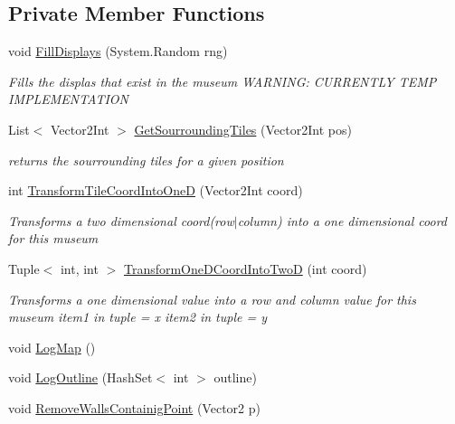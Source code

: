 \subsection*{Private Member Functions}
\begin{DoxyCompactItemize}
\item 
void \mbox{\hyperlink{class_museum_ae07741bc8fd7f97c84fed0050e18c3c4}{Fill\+Displays}} (System.\+Random rng)
\begin{DoxyCompactList}\small\item\em Fills the displas that exist in the museum W\+A\+R\+N\+I\+NG\+: C\+U\+R\+R\+E\+N\+T\+LY T\+E\+MP I\+M\+P\+L\+E\+M\+E\+N\+T\+A\+T\+I\+ON \end{DoxyCompactList}\item 
List$<$ Vector2\+Int $>$ \mbox{\hyperlink{class_museum_af5b732fe3a0821d02852171a73cf8f8b}{Get\+Sourrounding\+Tiles}} (Vector2\+Int pos)
\begin{DoxyCompactList}\small\item\em returns the sourrounding tiles for a given position \end{DoxyCompactList}\item 
int \mbox{\hyperlink{class_museum_a405e60db962417dde46d46180cbf81df}{Transform\+Tile\+Coord\+Into\+OneD}} (Vector2\+Int coord)
\begin{DoxyCompactList}\small\item\em Transforms a two dimensional coord(row$\vert$column) into a one dimensional coord for this museum \end{DoxyCompactList}\item 
Tuple$<$ int, int $>$ \mbox{\hyperlink{class_museum_a72e9020ee5d8406df0fc41fc4295727f}{Transform\+One\+D\+Coord\+Into\+TwoD}} (int coord)
\begin{DoxyCompactList}\small\item\em Transforms a one dimensional value into a row and column value for this museum item1 in tuple = x item2 in tuple = y \end{DoxyCompactList}\item 
void \mbox{\hyperlink{class_museum_a6a161feedcbb8a471eb0e68b7e3e4027}{Log\+Map}} ()
\item 
void \mbox{\hyperlink{class_museum_a237d1ccf7cb53c4db64647b6addc6576}{Log\+Outline}} (Hash\+Set$<$ int $>$ outline)
\item 
void \mbox{\hyperlink{class_museum_a6b395af086d9773720b1cb5536f405a8}{Remove\+Walls\+Containig\+Point}} (Vector2 p)
\end{DoxyCompactItemize}
